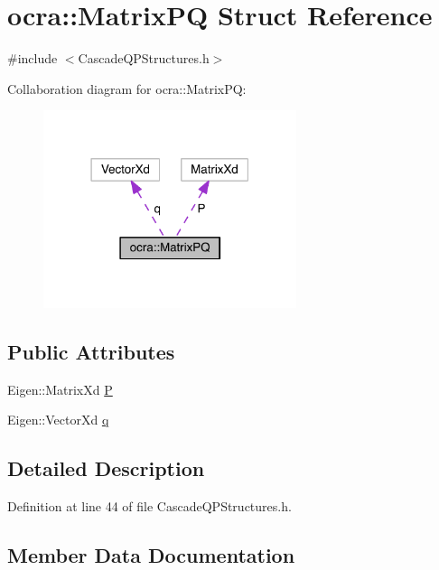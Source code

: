 \hypertarget{structocra_1_1MatrixPQ}{}\section{ocra\+:\+:Matrix\+PQ Struct Reference}
\label{structocra_1_1MatrixPQ}


{\ttfamily \#include $<$Cascade\+Q\+P\+Structures.\+h$>$}



Collaboration diagram for ocra\+:\+:Matrix\+PQ\+:\nopagebreak
\begin{figure}[H]
\begin{center}
\leavevmode
\includegraphics[width=210pt]{d2/d68/structocra_1_1MatrixPQ__coll__graph}
\end{center}
\end{figure}
\subsection*{Public Attributes}
\begin{DoxyCompactItemize}
\item 
Eigen\+::\+Matrix\+Xd \hyperlink{structocra_1_1MatrixPQ_ae37e780774f14b1097de106d1480cee4}{P}
\item 
Eigen\+::\+Vector\+Xd \hyperlink{structocra_1_1MatrixPQ_a5b735797657100582565c6337fb090e1}{q}
\end{DoxyCompactItemize}


\subsection{Detailed Description}


Definition at line 44 of file Cascade\+Q\+P\+Structures.\+h.



\subsection{Member Data Documentation}
\hypertarget{structocra_1_1MatrixPQ_ae37e780774f14b1097de106d1480cee4}{}\label{structocra_1_1MatrixPQ_ae37e780774f14b1097de106d1480cee4} 
